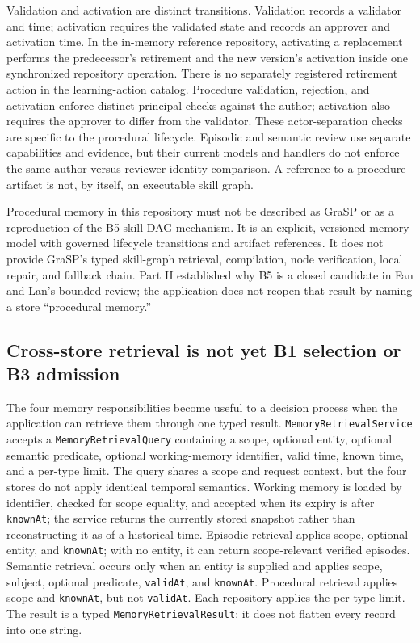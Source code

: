 Validation and activation are distinct transitions. Validation records a validator and time; activation requires the validated state and records an approver and activation time. In the in-memory reference repository, activating a replacement performs the predecessor's retirement and the new version's activation inside one synchronized repository operation. There is no separately registered retirement action in the learning-action catalog. Procedure validation, rejection, and activation enforce distinct-principal checks against the author; activation also requires the approver to differ from the validator. These actor-separation checks are specific to the procedural lifecycle. Episodic and semantic review use separate capabilities and evidence, but their current models and handlers do not enforce the same author-versus-reviewer identity comparison. A reference to a procedure artifact is not, by itself, an executable skill graph.

\begin{warningbox}
Procedural memory in this repository must not be described as GraSP or as a reproduction of the B5 skill-DAG mechanism. It is an explicit, versioned memory model with governed lifecycle transitions and artifact references. It does not provide GraSP's typed skill-graph retrieval, compilation, node verification, local repair, and fallback chain. Part II established why B5 is a closed candidate in Fan and Lan's bounded review; the application does not reopen that result by naming a store “procedural memory.”
\end{warningbox}

\subsection{Cross-store retrieval is not yet B1 selection or B3 admission}
\label{subsec:ch20-memory-retrieval}

The four memory responsibilities become useful to a decision process when the application can retrieve them through one typed result. \texttt{MemoryRetrievalService} accepts a \texttt{MemoryRetrievalQuery} containing a scope, optional entity, optional semantic predicate, optional working-memory identifier, valid time, known time, and a per-type limit. The query shares a scope and request context, but the four stores do not apply identical temporal semantics. Working memory is loaded by identifier, checked for scope equality, and accepted when its expiry is after \texttt{knownAt}; the service returns the currently stored snapshot rather than reconstructing it as of a historical time. Episodic retrieval applies scope, optional entity, and \texttt{knownAt}; with no entity, it can return scope-relevant verified episodes. Semantic retrieval occurs only when an entity is supplied and applies scope, subject, optional predicate, \texttt{validAt}, and \texttt{knownAt}. Procedural retrieval applies scope and \texttt{knownAt}, but not \texttt{validAt}. Each repository applies the per-type limit. The result is a typed \texttt{MemoryRetrievalResult}; it does not flatten every record into one string.


